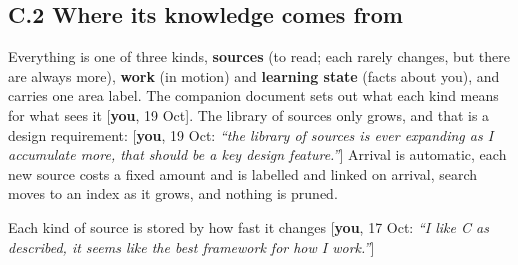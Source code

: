 \documentclass[10pt]{extarticle}
\newcommand{\you}[2]{{\small[\textbf{you}, #1: \textit{``#2''}]}}
\newcommand{\youx}[1]{{\small[\textbf{you}, #1]}}
\newcommand{\Sub}[1]{\subsection*{#1}}
\begin{document}
\Sub{C.2 Where its knowledge comes from}
Everything is one of three kinds, \textbf{sources} (to read; each rarely changes, but there are always more), \textbf{work} (in motion) and \textbf{learning state} (facts about you), and carries one area label. The companion document sets out what each kind means for what sees it \youx{19 Oct}. The library of sources only grows, and that is a design requirement: \you{19 Oct}{the library of sources is ever expanding as I accumulate more, that should be a key design feature.} Arrival is automatic, each new source costs a fixed amount and is labelled and linked on arrival, search moves to an index as it grows, and nothing is pruned.


Each kind of source is stored by how fast it changes \you{17 Oct}{I like C as described, it seems like the best framework for how I work.}

\begin{figure}[h]
\centering
{}
\end{figure}
\end{document}

